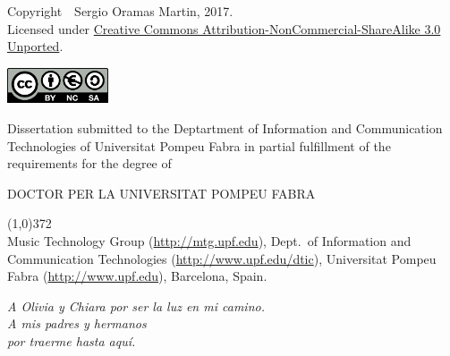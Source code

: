\cleartorecto
\thispagestyle{empty}

{\footnotesize Copyright~\textcopyright~Sergio Oramas Martin, 2017.}
\\{\footnotesize Licensed under \href{http://creativecommons.org/licenses/by-nc-sa/3.0/}{Creative Commons Attribution-NonCommercial-ShareAlike 3.0 Unported}.}

\href{http://creativecommons.org/licenses/by-nc-sa/3.0/}{\includegraphics[width=3cm]{ch00_pics/creative-commons2.png}}


\vspace*{5cm}


Dissertation submitted to the Deptartment of Information and Communication Technologies of Universitat Pompeu Fabra in partial fulfillment of the requirements for the degree of

\vspace*{0.5cm}

\centerline{DOCTOR PER LA UNIVERSITAT POMPEU FABRA}

\vspace*{0.6cm}



\vspace*{\fill}

\line(1,0){372}\\
\footnotesize
Music Technology Group (\url{http://mtg.upf.edu}), Dept.~of Information and Communication Technologies (\url{http://www.upf.edu/dtic}), Universitat Pompeu Fabra (\url{http://www.upf.edu}), Barcelona, Spain.
\normalsize


\cleartorecto



\cleartorecto
\thispagestyle{empty}
\vspace*{3cm}
\begin{flushright}
\textit{A Olivia y Chiara por ser la luz en mi camino.\\ A mis padres y hermanos\\ por traerme hasta aquí.}
\end{flushright}

